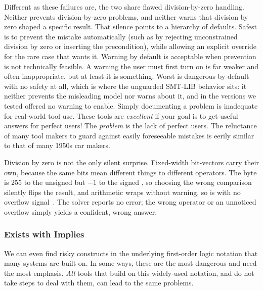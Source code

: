 Different as these failures are, the two share flawed division-by-zero handling. Neither prevents division-by-zero problems, and neither warns that division by zero shaped a specific result. That silence points to a hierarchy of defaults. Safest is to prevent the mistake automatically (such as by rejecting unconstrained division by zero or inserting the precondition), while allowing an explicit override for the rare case that wants it. Warning by default is acceptable when prevention is not technically feasible. A warning the user must first turn on is far weaker and often inappropriate, but at least it is something. Worst is dangerous by default with no safety at all, which is where the unguarded SMT-LIB behavior sits: it neither prevents the misleading model nor warns about it, and in the versions we tested offered no warning to enable. Simply documenting a problem is inadequate for real-world tool use. These tools are \emph{excellent} if your goal is to get useful answers for perfect users! The \emph{problem} is the lack of perfect users. The reluctance of many tool makers to guard against easily foreseeable mistakes is eerily similar to that of many 1950s car makers.

Division by zero is not the only silent surprise. Fixed-width bit-vectors carry their own, because the same bits mean different things to different operators. The byte  is $255$ to the unsigned  but $-1$ to the signed , so choosing the wrong comparison silently flips the result, and arithmetic wraps without warning, so  is  with no overflow signal~\cite{BarFT-RR-25}. The solver reports no error; the wrong operator or an unnoticed overflow simply yields a confident, wrong answer.

\subsubsection{Exists with Implies}

We can even find risky constructs in the underlying first-order logic notation that many systems are built on. In some ways, these are the most dangerous and need the most emphasis. \emph{All} tools that build on this widely-used notation, and do not take steps to deal with them, can lead to the same problems.

